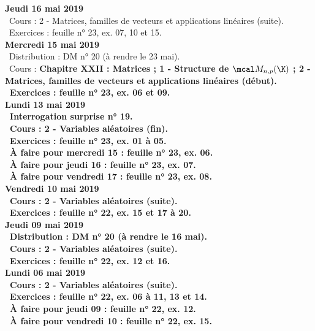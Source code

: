 \documentclass[12pt,a4paper]{article}
\begin{document}
\noindent\textbf{Jeudi 16 mai 2019}\\
\bu\ Cours : 2 - Matrices, familles de vecteurs et applications linéaires (suite).\\
\bu\ Exercices : feuille n° 23, ex. 07, 10 et 15.\vspace{.4cm}\\

\noindent\textbf{Mercredi 15 mai 2019}\\
\bu\ Distribution : DM n° 20 (à rendre le 23 mai).\\
\bu\ Cours : \bf Chapitre XXII \rm : Matrices ; 1 - Structure de $\mcal M_{n,p}(\K)$ ; 2 - Matrices, familles de 
vecteurs et applications linéaires (début).\\
\bu\ Exercices : feuille n° 23, ex. 06 et 09.\vspace{.4cm}\\

\noindent\textbf{Lundi 13 mai 2019}\\
\bu\ Interrogation surprise n° 19.\\
\bu\ Cours : 2 - Variables aléatoires (fin).\\
\bu\ Exercices : feuille n° 23, ex. 01 à 05.\\
\bu\ À faire pour mercredi 15 : feuille n° 23, ex. 06.\\
\bu\ À faire pour jeudi 16 : feuille n° 23, ex. 07.\\
\bu\ À faire pour vendredi 17 : feuille n° 23, ex. 08.\vspace{.4cm}\\

\noindent\textbf{Vendredi 10 mai 2019}\\
\bu\ Cours : 2 - Variables aléatoires (suite).\\
\bu\ Exercices : feuille n° 22, ex. 15 et 17 à 20.\vspace{.4cm}\\

\noindent\textbf{Jeudi 09 mai 2019}\\
\bu\ Distribution : DM n° 20 (à rendre le 16 mai).\\
\bu\ Cours : 2 - Variables aléatoires (suite).\\
\bu\ Exercices : feuille n° 22, ex. 12 et 16.\vspace{.4cm}\\

\noindent\textbf{Lundi 06 mai 2019}\\
\bu\ Cours : 2 - Variables aléatoires (suite).\\
\bu\ Exercices : feuille n° 22, ex. 06 à 11, 13 et 14.\\
\bu\ À faire pour jeudi 09 : feuille n° 22, ex. 12.\\
\bu\ À faire pour vendredi 10 : feuille n° 22, ex. 15.\vspace{.4cm}\\
\end{document}
